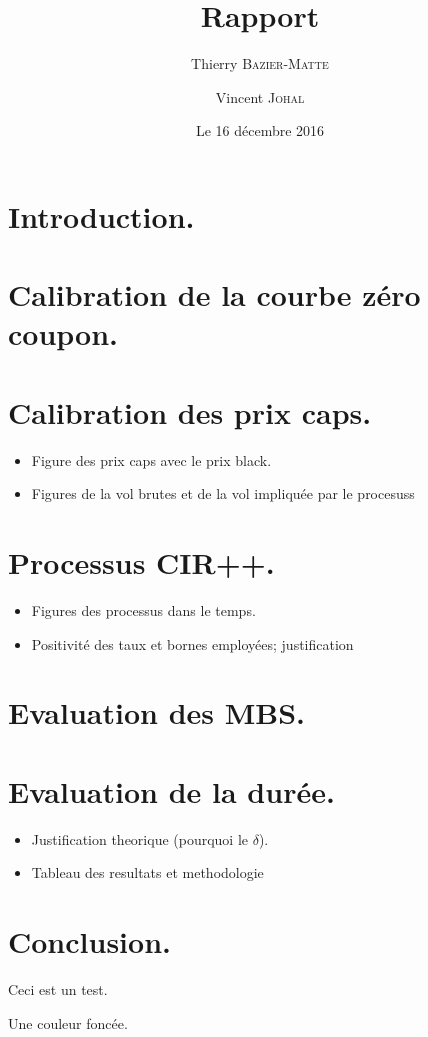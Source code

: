 \documentclass{article}
\title{Rapport}
\author{Thierry \textsc{Bazier-Matte} \and Vincent \textsc{Johal}}
\date{Le 16 décembre 2016}
\begin{document}
\maketitle

\section{Introduction.}

\section{Calibration de la courbe zéro coupon.}




\section{Calibration des prix caps.}

\begin{itemize}
\item Figure des prix caps avec le prix black.
\item Figures de la vol brutes et de la vol impliquée par le procesuss
\end{itemize}

\section{Processus CIR++.}
\begin{itemize}
\item Figures des processus dans le temps.
\item Positivité des taux et bornes employées; justification
\end{itemize}

\section{Evaluation des MBS.}


\section{Evaluation de la durée.}
\begin{itemize}
\item Justification theorique (pourquoi le $\delta$).
\item Tableau des resultats et methodologie
\end{itemize}

\section{Conclusion.}

Ceci est un test.

Une couleur foncée.




\end{document}
